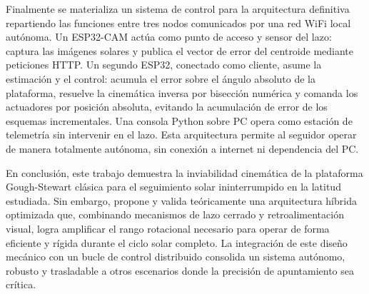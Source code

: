 \begin{resumen}
Finalmente se materializa un sistema de control para la arquitectura definitiva repartiendo las funciones entre tres nodos comunicados por una red WiFi local autónoma. Un ESP32-CAM actúa como punto de acceso y sensor del lazo: captura las imágenes solares y publica el vector de error del centroide mediante peticiones HTTP. Un segundo ESP32, conectado como cliente, asume la estimación y el control: acumula el error sobre el ángulo absoluto de la plataforma, resuelve la cinemática inversa por bisección numérica y comanda los actuadores por posición absoluta, evitando la acumulación de error de los esquemas incrementales. Una consola Python sobre PC opera como estación de telemetría sin intervenir en el lazo. Esta arquitectura permite al seguidor operar de manera totalmente autónoma, sin conexión a internet ni dependencia del PC.

En conclusión, este trabajo demuestra la inviabilidad cinemática de la plataforma Gough-Stewart clásica para el seguimiento solar ininterrumpido en la latitud estudiada. Sin embargo, propone y valida teóricamente una arquitectura híbrida optimizada que, combinando mecanismos de lazo cerrado y retroalimentación visual, logra amplificar el rango rotacional necesario para operar de forma eficiente y rígida durante el ciclo solar completo. La integración de este diseño mecánico con un bucle de control distribuido consolida un sistema autónomo, robusto y trasladable a otros escenarios donde la precisión de apuntamiento sea crítica.


\end{resumen}

